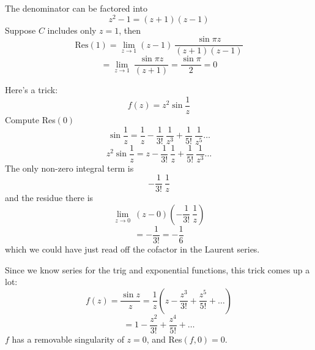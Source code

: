 \documentclass[11pt, oneside]{article}
\begin{document}
The denominator can be factored into 
\[ z^2 - 1 = (z + 1)(z - 1) \]
Suppose $C$ includes only $z = 1$, then
\[ \text{Res}(1) = \lim_{z \rightarrow 1}  (z-1) \ \frac{\sin \pi z}{(z + 1)(z - 1)} \]
\[ = \lim_{z \rightarrow 1} \ \frac{\sin \pi z}{(z + 1)} = \frac{\sin \pi}{2} =  0 \]

Here's a trick:
\[ f(z) = z^2 \sin \frac{1}{z} \]
Compute Res$(0)$
\[ \sin \frac{1}{z} = \frac{1}{z} - \frac{1}{3!} \ \frac{1}{z^3} + \frac{1}{5!} \ \frac{1}{z^5} \dots \]
\[ z^2 \sin \frac{1}{z} = z - \frac{1}{3!} \ \frac{1}{z} + \frac{1}{5!} \ \frac{1}{z^3} \dots \]
The only non-zero integral term is 
\[ - \frac{1}{3!} \ \frac{1}{z} \]
and the residue there is
\[ \lim_{z \rightarrow 0} \ (z - 0) (- \frac{1}{3!} \ \frac{1}{z}) \]
\[ = - \frac{1}{3!} = - \frac{1}{6} \]
which we could have just read off the cofactor in the Laurent series.

Since we know series for the trig and exponential functions, this trick comes up a lot:
\[ f(z) = \frac{\sin z}{z} = \frac{1}{z} (z - \frac{z^3}{3!} + \frac{z^5}{5!} + \dots) \]
\[ = 1 - \frac{z^2}{3!} + \frac{z^4}{5!} + \dots \]
$f$ has a removable singularity of $z = 0$, and Res$(f,0) = 0$.
\end{document}
